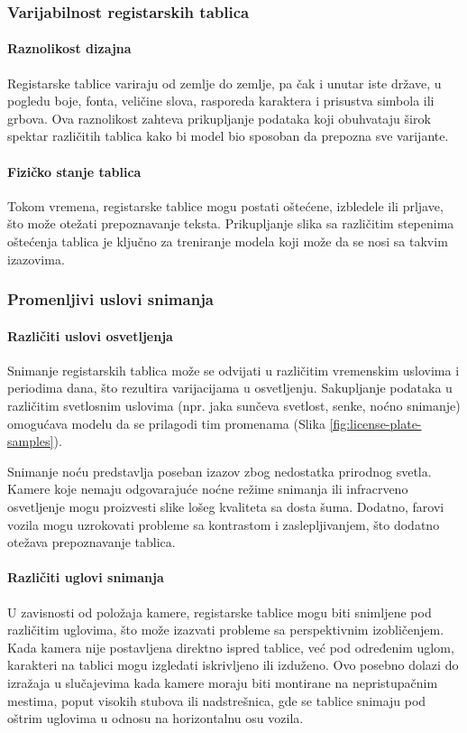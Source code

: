\documentclass[a4paper,12pt]{article}
\begin{document}
	\subsubsection{Varijabilnost registarskih tablica}
	\paragraph{Raznolikost dizajna}
	Registarske tablice variraju od zemlje do zemlje, pa čak i unutar iste države, u pogledu boje, fonta, veličine slova, rasporeda karaktera i prisustva simbola ili grbova. Ova raznolikost zahteva prikupljanje podataka koji obuhvataju širok spektar različitih tablica kako bi model bio sposoban da prepozna sve varijante.
	
	\paragraph{Fizičko stanje tablica}
	Tokom vremena, registarske tablice mogu postati oštećene, izbledele ili prljave, što može otežati prepoznavanje teksta. Prikupljanje slika sa različitim stepenima oštećenja tablica je ključno za treniranje modela koji može da se nosi sa takvim izazovima.
	
	\subsubsection{Promenljivi uslovi snimanja}
	\paragraph{Različiti uslovi osvetljenja}
	Snimanje registarskih tablica može se odvijati u različitim vremenskim uslovima i periodima dana, što rezultira varijacijama u osvetljenju. Sakupljanje podataka u različitim svetlosnim uslovima (npr. jaka sunčeva svetlost, senke, noćno snimanje) omogućava modelu da se prilagodi tim promenama (Slika \ref{fig:license-plate-samples}).
	
	Snimanje noću predstavlja poseban izazov zbog nedostatka prirodnog svetla. Kamere koje nemaju odgovarajuće noćne režime snimanja ili infracrveno osvetljenje mogu proizvesti slike lošeg kvaliteta sa dosta šuma. Dodatno, farovi vozila mogu uzrokovati probleme sa kontrastom i zaslepljivanjem, što dodatno otežava prepoznavanje tablica.
	
	\paragraph{Različiti uglovi snimanja}
	U zavisnosti od položaja kamere, registarske tablice mogu biti snimljene pod različitim uglovima, što može izazvati probleme sa perspektivnim izobličenjem. Kada kamera nije postavljena direktno ispred tablice, već pod određenim uglom, karakteri na tablici mogu izgledati iskrivljeno ili izduženo. Ovo posebno dolazi do izražaja u slučajevima kada kamere moraju biti montirane na nepristupačnim mestima, poput visokih stubova ili nadstrešnica, gde se tablice snimaju pod oštrim uglovima u odnosu na horizontalnu osu vozila.
	
\end{document}
